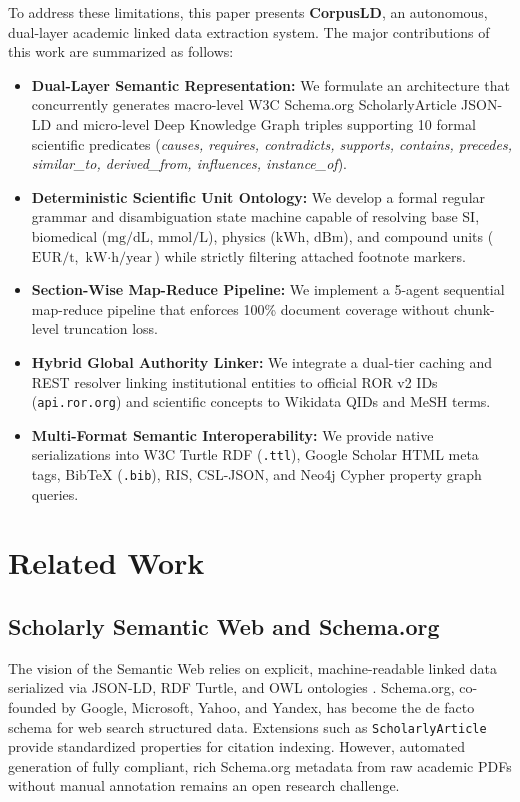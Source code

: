 \documentclass[conference]{IEEEtran}
\begin{document}
To address these limitations, this paper presents \textbf{CorpusLD}, an autonomous, dual-layer academic linked data extraction system. The major contributions of this work are summarized as follows:
\begin{itemize}
    \item \textbf{Dual-Layer Semantic Representation:} We formulate an architecture that concurrently generates macro-level W3C Schema.org ScholarlyArticle JSON-LD and micro-level Deep Knowledge Graph triples supporting 10 formal scientific predicates (\textit{causes, requires, contradicts, supports, contains, precedes, similar\_to, derived\_from, influences, instance\_of}).
    \item \textbf{Deterministic Scientific Unit Ontology:} We develop a formal regular grammar and disambiguation state machine capable of resolving base SI, biomedical ($\text{mg/dL}$, $\text{mmol/L}$), physics ($\text{kWh}$, $\text{dBm}$), and compound units ($\text{EUR/t}$, $\text{kW}\cdot\text{h/year}$) while strictly filtering attached footnote markers.
    \item \textbf{Section-Wise Map-Reduce Pipeline:} We implement a 5-agent sequential map-reduce pipeline that enforces 100\% document coverage without chunk-level truncation loss.
    \item \textbf{Hybrid Global Authority Linker:} We integrate a dual-tier caching and REST resolver linking institutional entities to official ROR v2 IDs (\texttt{api.ror.org}) and scientific concepts to Wikidata QIDs and MeSH terms.
    \item \textbf{Multi-Format Semantic Interoperability:} We provide native serializations into W3C Turtle RDF (\texttt{.ttl}), Google Scholar HTML meta tags, BibTeX (\texttt{.bib}), RIS, CSL-JSON, and Neo4j Cypher property graph queries.
\end{itemize}

\section{Related Work}

\subsection{Scholarly Semantic Web and Schema.org}
The vision of the Semantic Web relies on explicit, machine-readable linked data serialized via JSON-LD, RDF Turtle, and OWL ontologies \cite{bizer2011linked}. Schema.org, co-founded by Google, Microsoft, Yahoo, and Yandex, has become the de facto schema for web search structured data. Extensions such as \texttt{ScholarlyArticle} provide standardized properties for citation indexing. However, automated generation of fully compliant, rich Schema.org metadata from raw academic PDFs without manual annotation remains an open research challenge.
\end{document}
